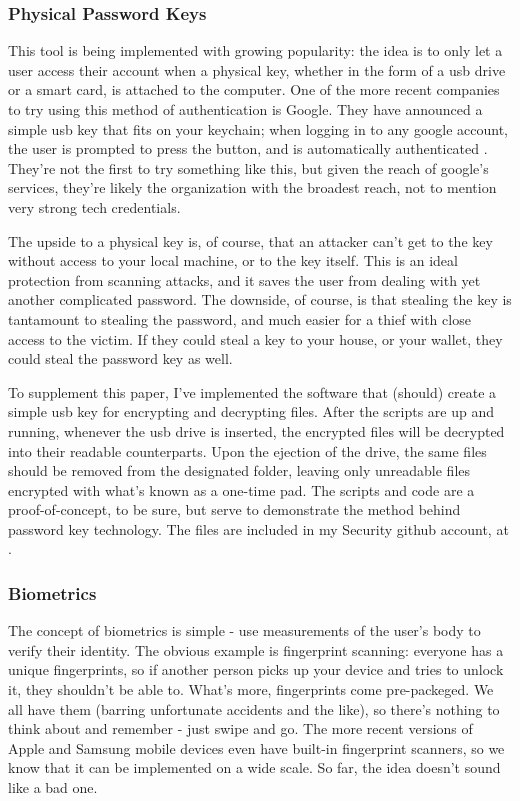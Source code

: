 \documentclass[12pt]{apa6}
\begin{document}
\subsubsection{Physical Password Keys}
This tool is being implemented with growing popularity: the idea is to only let a user access their account when a physical key, whether in the form of a usb drive or a smart card, is attached to the computer. One of the more recent companies to try using this method of authentication is Google. They have announced a simple usb key that fits on your keychain; when logging in to any google account, the user is prompted to press the button, and is automatically authenticated \parencite{simon14}. They're not the first to try something like this, but given the reach of google's services, they're likely the organization with the broadest reach, not to mention very strong tech credentials.

The upside to a physical key is, of course, that an attacker can't get to the key without access to your local machine, or to the key itself. This is an ideal protection from scanning attacks, and it saves the user from dealing with yet another complicated password. The downside, of course, is that stealing the key is tantamount to stealing the password, and much easier for a thief with close access to the victim. If they could steal a key to your house, or your wallet, they could steal the password key as well.

To supplement this paper, I've implemented the software that (should) create a simple usb key for encrypting and decrypting files. After the scripts are up and running, whenever the usb drive is inserted, the encrypted files will be decrypted into their readable counterparts. Upon the ejection of the drive, the same files should be removed from the designated folder, leaving only unreadable files encrypted with what's known as a one-time pad. The scripts and code are a proof-of-concept, to be sure, but serve to demonstrate the method behind password key technology. The files are included in my Security github account, at .

\subsubsection{Biometrics}
The concept of biometrics is simple - use measurements of the user's body to verify their identity. The obvious example is fingerprint scanning: everyone has a unique fingerprints, so if another person picks up your device and tries to unlock it, they shouldn't be able to. What's more, fingerprints come pre-packeged. We all have them (barring unfortunate accidents and the like), so there's nothing to think about and remember - just swipe and go. The more recent versions of Apple and Samsung mobile devices even have built-in fingerprint scanners, so we know that it can be implemented on a wide scale. So far, the idea doesn't sound like a bad one.
\end{document}
